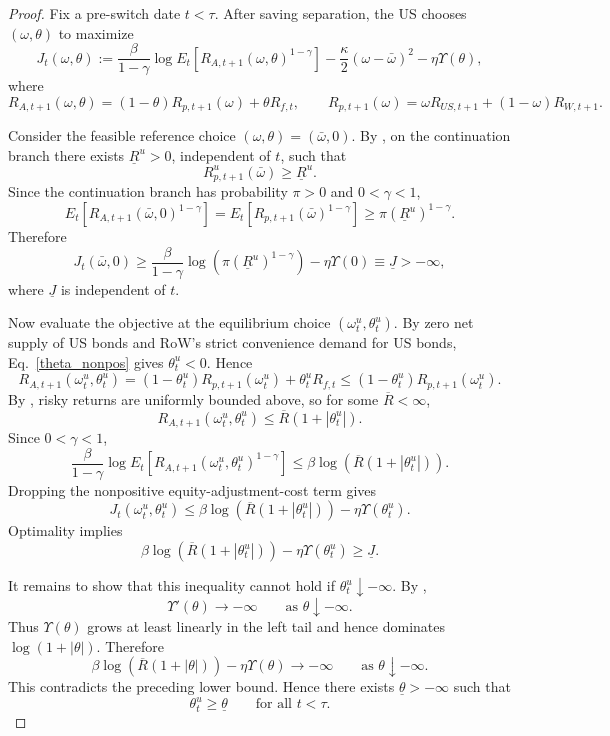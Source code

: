 \documentclass{article}
\begin{document}
\begin{proof}
Fix a pre-switch date $t<\tau$. After saving separation, the US chooses $(\omega,\theta)$ to maximize
\[
J_t(\omega,\theta)
:=
\frac{\beta}{1-\gamma}\log E_t\!\left[R_{A,t+1}(\omega,\theta)^{1-\gamma}\right]
-\frac{\kappa}{2}(\omega-\bar\omega)^2
-\eta\Upsilon(\theta),
\]
where
\[
R_{A,t+1}(\omega,\theta)
=(1-\theta)R_{p,t+1}(\omega)+\theta R_{f,t},
\qquad
R_{p,t+1}(\omega)=\omega R_{US,t+1}+(1-\omega)R_{W,t+1}.
\]

Consider the feasible reference choice $(\omega,\theta)=(\bar\omega,0)$.
By , on the continuation branch there exists
$\underline R^u>0$, independent of $t$, such that
\[
R_{p,t+1}^u(\bar\omega)\ge \underline R^u.
\]
Since the continuation branch has probability $\pi>0$ and $0<\gamma<1$,
\[
E_t\!\left[
R_{A,t+1}(\bar\omega,0)^{1-\gamma}
\right]
=
E_t\!\left[
R_{p,t+1}(\bar\omega)^{1-\gamma}
\right]
\ge
\pi(\underline R^u)^{1-\gamma}.
\]
Therefore
\[
J_t(\bar\omega,0)
\ge
\frac{\beta}{1-\gamma}
\log\!\left(\pi(\underline R^u)^{1-\gamma}\right)
-\eta\Upsilon(0)
\equiv
\underline J
>
-\infty,
\]
where $\underline J$ is independent of $t$.

Now evaluate the objective at the equilibrium choice
$(\omega_t^u,\theta_t^u)$. By zero net supply of US bonds and RoW's
strict convenience demand for US bonds, Eq.~\eqref{theta_nonpos} gives
$\theta_t^u<0$. Hence
\[
R_{A,t+1}(\omega_t^u,\theta_t^u)
=
(1-\theta_t^u)R_{p,t+1}(\omega_t^u)
+\theta_t^uR_{f,t}
\le
(1-\theta_t^u)R_{p,t+1}(\omega_t^u).
\]
By , risky returns are uniformly bounded above,
so for some $\overline R<\infty$,
\[
R_{A,t+1}(\omega_t^u,\theta_t^u)
\le
\overline R(1+|\theta_t^u|).
\]
Since $0<\gamma<1$,
\[
\frac{\beta}{1-\gamma}
\log E_t\!\left[
R_{A,t+1}(\omega_t^u,\theta_t^u)^{1-\gamma}
\right]
\le
\beta\log\!\left(\overline R(1+|\theta_t^u|)\right).
\]
Dropping the nonpositive equity-adjustment-cost term gives
\[
J_t(\omega_t^u,\theta_t^u)
\le
\beta\log\!\left(\overline R(1+|\theta_t^u|)\right)
-\eta\Upsilon(\theta_t^u).
\]
Optimality implies
\[
\beta\log\!\left(\overline R(1+|\theta_t^u|)\right)
-\eta\Upsilon(\theta_t^u)
\ge
\underline J.
\]

It remains to show that this inequality cannot hold if
$\theta_t^u\downarrow-\infty$. By ,
\[
\Upsilon'(\theta)\to-\infty
\qquad\text{as }\theta\downarrow-\infty.
\]
Thus $\Upsilon(\theta)$ grows at least linearly in the left tail and hence
dominates $\log(1+|\theta|)$. Therefore
\[
\beta\log\!\left(\overline R(1+|\theta|)\right)
-\eta\Upsilon(\theta)
\to
-\infty
\qquad\text{as }\theta\downarrow-\infty.
\]
This contradicts the preceding lower bound. Hence there exists
$\underline\theta>-\infty$ such that
\[
\theta_t^u\ge \underline\theta
\qquad\text{for all }t<\tau.
\]
\end{proof}
\end{document}
